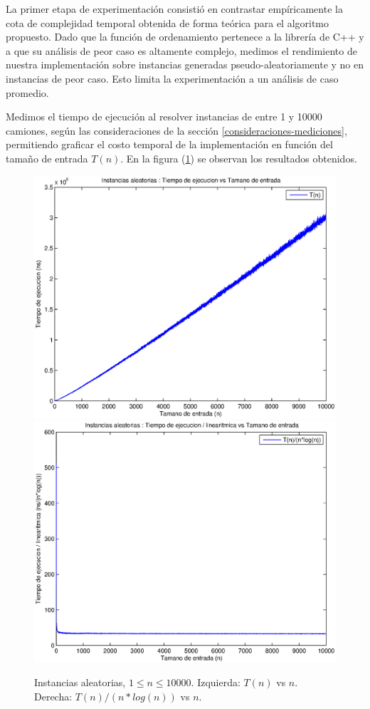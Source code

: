 La primer etapa de experimentación consistió en contrastar empíricamente la cota de complejidad temporal obtenida de forma teórica para el algoritmo propuesto. Dado que la función de ordenamiento pertenece a la librería de C++ y a que su análisis de peor caso es altamente complejo, medimos el rendimiento de nuestra implementación sobre instancias generadas pseudo-aleatoriamente y no en instancias de peor caso. Esto limita la experimentación a un análisis de caso promedio.

Medimos el tiempo de ejecución al resolver instancias de entre 1 y 10000 camiones, según las consideraciones de la sección \ref{consideraciones-mediciones}, permitiendo graficar el costo temporal de la implementación en función del tamaño de entrada $T(n)$. En la figura (\ref{fig:problema1-aleatoria-10000}) se observan los resultados obtenidos.

\begin{center}
  \begin{figure}[H]
    \includegraphics[width=0.5\linewidth]{problema1/graficos/problema1_aleatoria_10000.eps}
    \includegraphics[width=0.5\linewidth]{problema1/graficos/problema1_aleatoria_10000_div_nlogn.eps}
    \caption{Instancias aleatorias, $1 \leq n \leq 10000$. Izquierda: $T(n)$ vs $n$. Derecha: $T(n) / (n * log(n))$ vs $n$.}
    \label{fig:problema1-aleatoria-10000}
  \end{figure}
\end{center}


